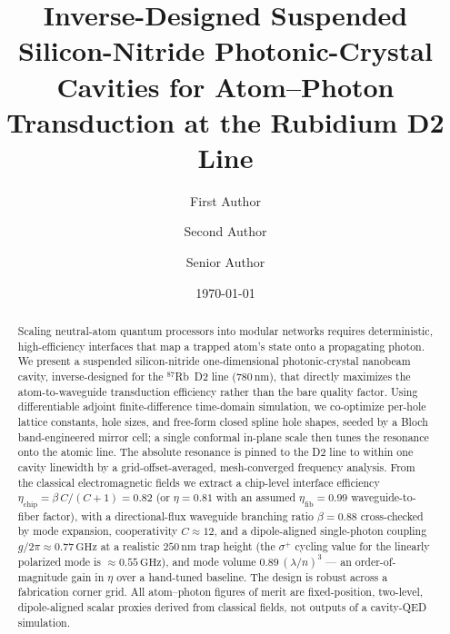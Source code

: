 \documentclass[%
 reprint,
 amsmath,amssymb,
 aps,prx,
 superscriptaddress,
]{revtex4-2}
\newcommand{\unit}[1]{\,\mathrm{#1}}
\begin{document}
\title{Inverse-Designed Suspended Silicon-Nitride Photonic-Crystal Cavities for
Atom--Photon Transduction at the Rubidium D2 Line}

\author{First Author}
\author{Second Author}
\author{Senior Author}

\date{\today}

\begin{abstract}
Scaling neutral-atom quantum processors into modular networks requires
deterministic, high-efficiency interfaces that map a trapped atom's state onto a
propagating photon. We present a suspended silicon-nitride one-dimensional
photonic-crystal nanobeam cavity, inverse-designed for the $^{87}$Rb~D2 line
($780\unit{nm}$), that directly maximizes the atom-to-waveguide transduction
efficiency rather than the bare quality factor. Using differentiable adjoint
finite-difference time-domain simulation, we co-optimize per-hole lattice
constants, hole sizes, and free-form closed spline hole shapes, seeded by a Bloch
band-engineered mirror cell; a single conformal in-plane scale then tunes the
resonance onto the atomic line. The absolute resonance is pinned to the D2 line
to within one cavity linewidth by a grid-offset-averaged, mesh-converged
frequency analysis. From the classical electromagnetic fields we extract a
chip-level interface efficiency $\eta_\mathrm{chip}=\beta\,C/(C{+}1)=0.82$ (or
$\eta=0.81$ with an assumed $\eta_\mathrm{fib}=0.99$ waveguide-to-fiber factor),
with a directional-flux waveguide branching ratio $\beta=0.88$ cross-checked by
mode expansion, cooperativity $C\approx12$, and a dipole-aligned single-photon
coupling $g/2\pi\approx0.77\unit{GHz}$ at a realistic $250\unit{nm}$ trap height
(the $\sigma^+$ cycling value for the linearly polarized mode is
$\approx0.55\unit{GHz}$), and mode volume $0.89\,(\lambda/n)^3$ --- an
order-of-magnitude gain in $\eta$ over a hand-tuned baseline. The design is robust across a fabrication
corner grid. All atom--photon figures of merit are fixed-position, two-level,
dipole-aligned scalar proxies derived from classical fields, not outputs of a
cavity-QED simulation.
\end{abstract}
\end{document}
